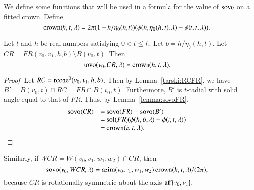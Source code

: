 We define some functions that will be used in a formula
for the value of ${\operatorname{sovo}}$ on a fitted crown.
Define
\begin{equation}\operatorname{crown}(h,t,\lambda) =
2\pi(1-h/\eta_0(h,t))(\phi(h,\eta_0(h,t),\lambda)-\phi(t,t,\lambda)). 
\end{equation} 

\begin{lemma}\label{lemma:sovo:CR} 
Let $t$ and $h$ be real numbers satisfying 
$0 < t \le h$.
Let $b=h/\eta_0(h,t)$.
Let $CR=FR(v_0,v_1,h,b) \setminus B(v_0,t)$.
  Then
$${\operatorname{sovo}}(v_0,CR,\lambda) = \operatorname{crown}(h,t,\lambda).$$
\end{lemma}

\begin{proof}  Let $RC={\operatorname{rcone}}^0(v_0,v_1,h,b)$.
Then by Lemma~\ref{tarski:RCFR}, we have
$B' = B(v_0,t)\cap RC = FR\cap B(v_0,t)$.
Furthermore, $B'$ is $t$-radial with solid angle equal to that
of $FR$.  Thus, by Lemma~\ref{lemma:sovoFR},
$$
\begin{array}{lll}
{\operatorname{sovo}}(CR) &= {\operatorname{sovo}}(FR) - {\operatorname{sovo}}(B')\\
 &= {\operatorname{sol}}(FR) (\phi(h,b,\lambda) - \phi(t,t,\lambda))\\
 &= \operatorname{crown}(h,t,\lambda).
\end{array}
$$
\end{proof}

Similarly, if $WCR = W(v_0,v_1,w_1,w_2) \cap CR$, then
$$
{\operatorname{sovo}}(v_0,WCR,\lambda) = {\operatorname{azim}}(v_0,v_1,w_1,w_2)\operatorname{crown}(h,t,\lambda)/(2\pi),
$$
because $CR$ 
is rotationally symmetric about the axis ${\operatorname{aff}}\{v_0,v_1\}$.



